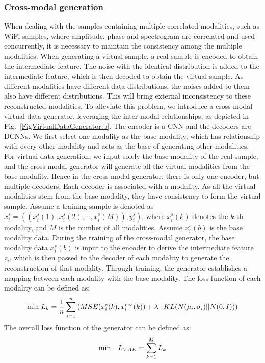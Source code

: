 \documentclass[journal]{IEEEtran}
\begin{document}
\subsubsection{Cross-modal generation}
When dealing with the samples containing multiple correlated modalities, such as WiFi samples, where amplitude, phase and spectrogram are correlated and used concurrently, it is necessary to maintain the consistency among the multiple modalities. When generating a virtual sample, a real sample is encoded to obtain the intermediate feature. The noise with the identical distribution is added to the intermediate feature, which is then decoded to obtain the virtual sample. As different modalities have different data distributions, the noises added to them also have different distributions. This will bring external inconsistency to these reconstructed modalities. To alleviate this problem, we introduce a cross-modal virtual data generator, leveraging the inter-modal relationships, as depicted in Fig.~\ref{FigVirtualDataGenerator:b}. The encoder is a CNN and the decoders are DCNNs. We first select one modality as the base modality, which has relationship with every other modality and acts as the base of generating other modalities. For virtual data generation, we input solely the base modality of the real sample, and the cross-modal generator will generate all the virtual modalities from the base modality. Hence in the cross-modal generator, there is only one encoder, but multiple decoders. Each decoder is associated with a modality. As all the virtual modalities stem from the base modality, they have consistency to form the virtual sample. Assume a training sample is denoted as $x_i^s=((x_i^s(1),x_i^s(2),\cdots,x_i^s(M)), y_i^{s})$, where $x_i^s(k)$ denotes the $k$-th modality, and $M$ is the number of all modalities. Assume $x_i^s(b)$ is the base modality data. During the training of the cross-modal generator, the base modality data $x_i^s(b)$ is input to the encoder to derive the intermediate feature $z_i$, which is then passed to the decoder of each modality to generate the reconstruction of that modality. Through training, the generator establishes a mapping between each modality with the base modality. The loss function of each modality can be defined as:
\begin{equation}
\footnotesize
 {\rm min}\ L_k  = \frac{1}{n} \sum_{i=1}^{n} \left( MSE(x_i^s(k), x_i^{res}(k)) + \lambda \cdot KL(N(\mu_i,\sigma_i)||N(0,I)) \right)
\end{equation}
The overall loss function of the generator can be defined as:
\begin{equation}
  {\rm min}\quad L_{VAE} = \sum_{k=1}^{M}L_k	
\end{equation}
\end{document}
